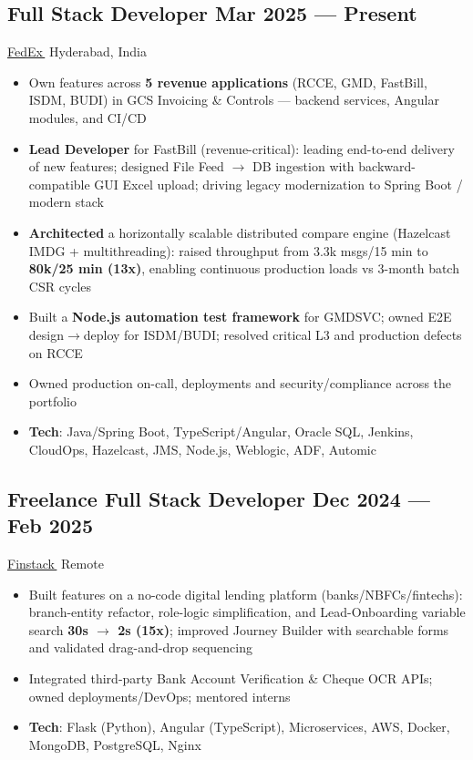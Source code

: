 \documentclass[a4paper,10pt]{article}
\let\orighref\href
\renewcommand{\href}[2]{\orighref{#1}{#2\,\faExternalLink}}
\newcommand{\subtext}[1]{
#1\par\vspace{-0.2cm}}
\newenvironment{zitemize}{
\begin{itemize}\itemsep0pt \parskip0pt \parsep1pt}
{\end{itemize}\vspace{-0.5cm}}
\begin{document}

        \subsection*{Full Stack Developer \hfill Mar 2025 --- Present} 
        \subtext{\href{https://www.fedex.com/global/choose-location.html}{FedEx} \hfill Hyderabad, India} 
        \begin{zitemize}
            \item Own features across \textbf{5 revenue applications} (RCCE, GMD, FastBill, ISDM, BUDI) in GCS Invoicing \& Controls --- backend services, Angular modules, and CI/CD
            \item \textbf{Lead Developer} for FastBill (revenue-critical): leading end-to-end delivery of new features; designed File Feed $\rightarrow$ DB ingestion with backward-compatible GUI Excel upload; driving legacy modernization to Spring Boot / modern stack
            \item \textbf{Architected} a horizontally scalable distributed compare engine (Hazelcast IMDG + multithreading): raised throughput from 3.3k msgs/15 min to \textbf{80k/25 min (13x)}, enabling continuous production loads vs 3-month batch CSR cycles
            \item Built a \textbf{Node.js automation test framework} for GMDSVC; owned E2E design$\rightarrow$deploy for ISDM/BUDI; resolved critical L3 and production defects on RCCE
            \item Owned production on-call, deployments and security/compliance across the portfolio
            \item \textbf{Tech}: Java/Spring Boot, TypeScript/Angular, Oracle SQL, Jenkins, CloudOps, Hazelcast, JMS, Node.js, Weblogic, ADF, Automic
        \end{zitemize}


        \subsection*{Freelance Full Stack Developer \hfill Dec 2024 --- Feb 2025} 
        \subtext{\href{https://finstack.in/}{Finstack} \hfill Remote} 
            \begin{zitemize}
                \item Built features on a no-code digital lending platform (banks/NBFCs/fintechs): branch-entity refactor, role-logic simplification, and Lead-Onboarding variable search \textbf{30s $\rightarrow$ 2s (15x)}; improved Journey Builder with searchable forms and validated drag-and-drop sequencing
                \item Integrated third-party Bank Account Verification \& Cheque OCR APIs; owned deployments/DevOps; mentored interns
                \item \textbf{Tech}: Flask (Python), Angular (TypeScript), Microservices, AWS, Docker, MongoDB, PostgreSQL, Nginx
            \end{zitemize}
        
\end{document}
